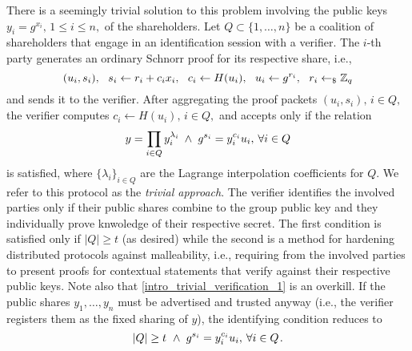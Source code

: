 \documentclass[10pt, psamsfonts, reqno]{amsart}
\theoremstyle{definition}
\theoremstyle{remark}
\numberwithin{equation}{section}
\begin{document}
There is a seemingly trivial solution to this problem
involving the public keys
$y_i = g ^ {x_i},\hspace{2pt} 1 \le i \le n,$
of the shareholders.
Let $Q \subset \{1, \dots, n\}$
be a coalition of shareholders that engage in
an identification session with a verifier.
The $i$-th party generates
an ordinary Schnorr proof
for its respective share, i.e.,
\vspace{5pt}
\begin{equation*}
(u_i, s_i),
\ \ s_i \leftarrow r_i + c_i x_i,
\ \ c_i \leftarrow H(u_i),
\ \ u_i \leftarrow g ^ {r_i},
\ \ r_i \leftarrow_\$ \mathbb{Z}_q
\vspace{5pt}
\end{equation*}
and sends it to the verifier.
After aggregating the proof packets
$(u_i, s_i),\hspace{2pt}i \in Q,$
the verifier computes
$c_i \leftarrow H(u_i),\hspace{2pt} i \in Q,$
and accepts only if the relation
\vspace{5pt}
\begin{equation}\label{intro_trivial_verification_1}
y = \prod_{i \in Q} y_i ^{\lambda_i}
\hspace{2.50pt}
\land
\hspace{3pt}
g ^ {s_i} = y_i ^ {c_i} u_i,
\hspace{2pt}
\forall i \in Q
\vspace{5pt}
\end{equation}
is satisfied, where $\{\lambda_i\}_{i \in Q}$ are the
Lagrange interpolation coefficients for $Q$.
We refer to this protocol as the \textit{trivial approach}.
The verifier identifies the involved parties only if
their public shares combine to the group public key
and they individually prove knwoledge of their respective secret.
The first condition is satisfied only if $|Q| \ge t$ (as desired)
while the second is a method for hardening
distributed protocols against malleability, i.e.,
requiring from the involved parties
to present proofs for contextual statements
that verify against their respective public keys.
Note also that \eqref{intro_trivial_verification_1} is an overkill.
If the public shares $y_1, \dots, y_n$
must be advertised and trusted anyway
(i.e., the verifier registers them as the fixed sharing of $y$),
the identifying condition reduces to
\vspace{5pt}
\begin{equation}\label{intro_trivial_verification_2}
|Q| \ge t
\hspace{3.50pt}
\land
\hspace{3pt}
g ^ {s_i} = y_i ^ {c_i} u_i,
\hspace{2pt}
\forall i \in Q
\hspace{1pt}.
\vspace{5pt}
\end{equation}
\end{document}
